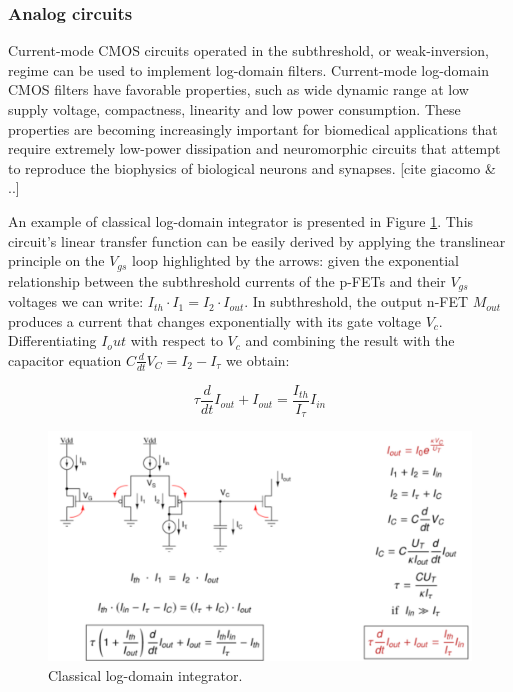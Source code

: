 \documentclass[main]{subfiles}
\begin{document}
\subsubsection{Analog circuits}

Current-mode CMOS circuits operated in the subthreshold, or weak-inversion, regime can be used to implement log-domain filters. Current-mode log-domain CMOS filters have favorable properties, such as wide dynamic range at low supply voltage, compactness, linearity and low power consumption. These properties are becoming increasingly important for biomedical applications that require extremely low-power dissipation and neuromorphic circuits that attempt to reproduce the biophysics of biological neurons and synapses. [cite giacomo & ..]

An example of classical log-domain integrator is presented in Figure \ref{fig:log-dom}. This circuit’s linear transfer function can be easily derived by applying the translinear principle on the $V_{gs}$ loop highlighted by the arrows: given the exponential relationship between the subthreshold currents of the p-FETs and their $V_{gs}$ voltages we can write: $I_{th} \cdot I_1 = I_2 \cdot I_{out}$. In subthreshold, the output n-FET $M_{out}$ produces a current that changes exponentially with its gate voltage $V_c$. Differentiating $I_out$ with respect to $V_c$ and combining the result with the capacitor equation $C\frac{d}{dt}V_{C} = I_{2}-I_{\tau}$ we obtain:

\begin{equation}
    \tau \frac{d}{dt}I_{out} + I_{out} = \frac{I_{th}}{I_{\tau}} I_{in}
\end{equation}{}

\begin{figure}[h]
    \centering
    \includegraphics[width=0.8\linewidth]{12_NeuromorphicSystems2/figures/log-dom.PNG}
    \caption{Classical log-domain integrator.}
    \label{fig:log-dom}
\end{figure}
%
\end{document}

